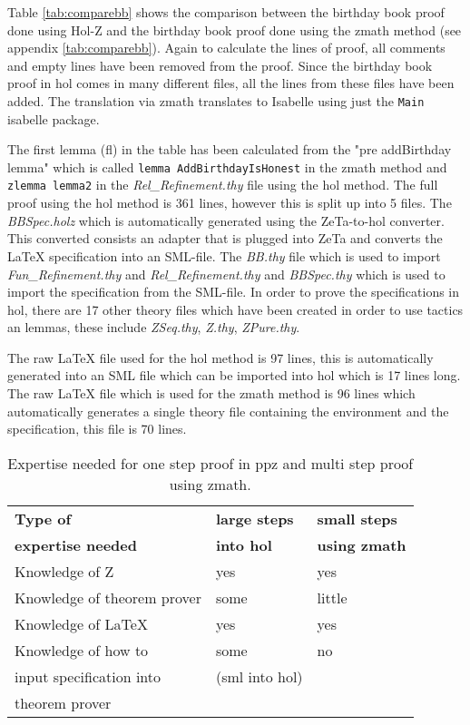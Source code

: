 Table \ref{tab:comparebb} shows the comparison between the birthday book proof
done using Hol-Z \cite{hol-z} and the birthday book proof done using the
\gls{zmath} method (see appendix \ref{tab:comparebb}). Again to calculate the
lines of proof, all comments and empty lines have been removed from the proof.
Since the birthday book proof in \gls{hol} comes in many different files, all
the lines from these files have been added. The translation via \gls{zmath}
translates to Isabelle using just the \texttt{Main} isabelle package.

The first lemma (fl) in the table has been calculated from the "pre addBirthday
lemma" which is called \texttt{lemma AddBirthdayIsHonest} in the \gls{zmath}
method and \texttt{zlemma lemma2} in the \emph{Rel\_Refinement.thy} file using
the \gls{hol} method. The full proof using the \gls{hol} method is 361 lines,
however this is split up into 5 files. The \emph{BBSpec.holz} which is
automatically generated using the ZeTa-to-\gls{hol} converter. This converted
consists an adapter that is plugged into ZeTa and converts the \LaTeX{}
specification into an SML-file. The \emph{BB.thy} file which is used to import
\emph{Fun\_Refinement.thy} and \emph{Rel\_Refinement.thy} and \emph{BBSpec.thy}
which is used to import the specification from the SML-file. In order to prove
the specifications in \gls{hol}, there are 17 other theory files which have been
created in order to use tactics an lemmas, these include \emph{ZSeq.thy},
\emph{Z.thy}, \emph{ZPure.thy}.

The raw \LaTeX{} file used for the \gls{hol} method is 97 lines, this is
automatically generated into an SML file which can be imported into \gls{hol}
which is 17 lines long. The raw \LaTeX{} file which is used for the \gls{zmath}
method is 96 lines which automatically generates a single theory file containing
the environment and the specification, this file is 70 lines.

\begin{table}[H]
\begin{center}
\begin{tabular}{| l | l | l |}
\hline
\textbf{Type of} & \textbf{large steps} & \textbf{small steps} \\
\textbf{expertise needed} & \textbf{into \gls{hol}} & \textbf{using \gls{zmath}}
\\
\hline
\hline
Knowledge of Z &  yes & yes \\
\hline
Knowledge of theorem prover & some & little \\
\hline
Knowledge of \LaTeX & yes & yes \\
\hline
Knowledge of how to & some & no \\
input specification into &(sml into \gls{hol})&  \\
theorem prover &  &  \\
\hline
\end{tabular}
\end{center}
\caption{Expertise needed for one step proof in \gls{ppz} and multi step proof using \gls{zmath}.}
\label{tab:expertisebb}
\end{table}

